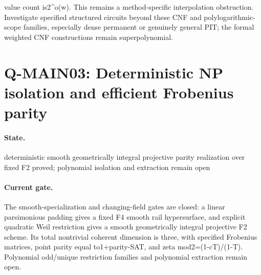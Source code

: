 value count is2\textasciicircum{}o(w). This remains a method-specific interpolation obstruction. Investigate specified structured circuits beyond these CNF and polylogarithmic-scope families, especially dense permanent or genuinely general PIT; the formal weighted CNF constructions remain superpolynomial.

\section{Q-MAIN03: Deterministic NP isolation and efficient Frobenius parity}
\paragraph{State.} deterministic smooth geometrically integral projective parity realization over fixed F2 proved; polynomial isolation and extraction remain open
\paragraph{Current gate.} The smooth-specialization and changing-field gates are closed: a linear parsimonious padding gives a fixed F4 smooth rail hypersurface, and explicit quadratic Weil restriction gives a smooth geometrically integral projective F2 scheme. Its total nontrivial coherent dimension is three, with specified Frobenius matrices, point parity equal to1+parity-SAT, and zeta mod2=(1-cT)/(1-T). Polynomial odd/unique restriction families and polynomial extraction remain open.

